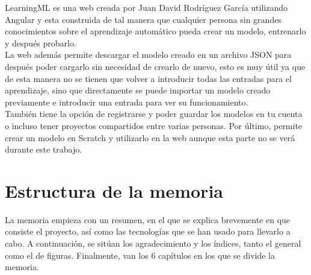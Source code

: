 \documentclass[a4paper, 12pt]{book}
\begin{document}
LearningML es una web creada por Juan David Rodríguez García utilizando Angular y esta construida de tal manera que cualquier persona sin grandes conocimientos sobre el aprendizaje automático pueda crear un modelo, entrenarlo y después probarlo. \\
La web además permite descargar el modelo creado en un archivo JSON para después poder cargarlo sin necesidad de crearlo de nuevo, esto es muy útil ya que de esta manera no se tienen que volver a introducir todas las entradas para el aprendizaje, sino que directamente se puede importar un modelo creado previamente e introducir una entrada para ver su funcionamiento. \\
También tiene la opción de registrarse y poder guardar los modelos en tu cuenta o incluso tener proyectos compartidos entre varias personas. Por último, permite crear un modelo en Scratch y utilizarlo en la web aunque esta parte no se verá durante este trabajo.


\section{Estructura de la memoria}
\label{sec:estructura}

La memoria empieza con un resumen, en el que se explica brevemente en que consiste el proyecto, así como las tecnologías que se han usado para llevarlo a cabo. A continuación, se sitúan los agradecimiento y los índices, tanto el general como el de figuras. Finalmente, van los 6 capítulos en los que se divide la memoria.
\end{document}
